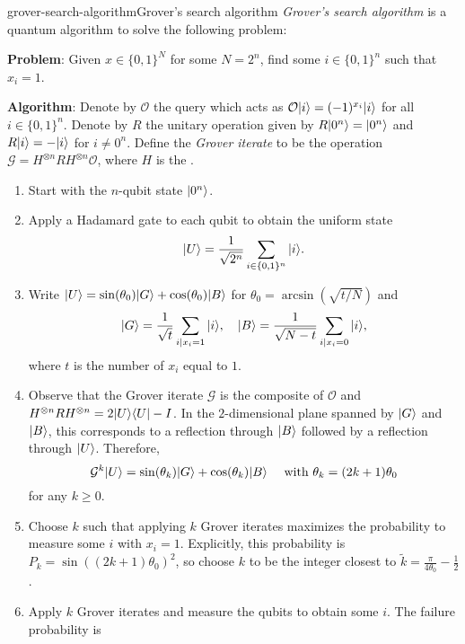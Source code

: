 \begin{topic}{grover-search-algorithm}{Grover's search algorithm}
    \emph{Grover's search algorithm} is a quantum algorithm to solve the following problem:

    \textbf{Problem}: Given $x \in \{ 0, 1 \}^N$ for some $N = 2^n$, find some $i \in \{ 0, 1 \}^n$ such that $x_i = 1$.

    \textbf{Algorithm}: Denote by $\mathcal{O}$ the query which acts as $\mathcal{O} |i\rangle = (-1)^{x_i} |i\rangle$ for all $i \in \{ 0, 1 \}^n$. Denote by $R$ the unitary operation given by $R |0^n\rangle = |0^n\rangle$ and $R |i\rangle = - |i\rangle$ for $i \ne 0^n$. Define the \textit{Grover iterate} to be the operation $\mathcal{G} = H^{\otimes n} R H^{\otimes n} \mathcal{O}$, where $H$ is the .
    \begin{enumerate}[label=(\arabic*)]
        \item Start with the $n$-qubit state $|0^n\rangle$.
        \item Apply a Hadamard gate to each qubit to obtain the uniform state
        \[ |U\rangle = \frac{1}{\sqrt{2^n}} \sum_{i \in \{ 0, 1 \}^n } |i\rangle . \]
        \item Write $|U\rangle = \sin(\theta_0) |G\rangle + \cos(\theta_0) |B\rangle$ for $\theta_0 = \arcsin(\sqrt{t / N})$ and
        \[ |G\rangle = \frac{1}{\sqrt{t}} \sum_{i \mid x_i = 1} |i\rangle, \quad |B\rangle = \frac{1}{\sqrt{N - t}} \sum_{i \mid x_i = 0} |i\rangle , \]
        where $t$ is the number of $x_i$ equal to $1$.
        \item Observe that the Grover iterate $\mathcal{G}$ is the composite of $\mathcal{O}$ and $H^{\otimes n} R H^{\otimes n} = 2 |U\rangle \langle U| - I$. In the $2$-dimensional plane spanned by $|G\rangle$ and $|B\rangle$, this corresponds to a reflection through $|B\rangle$ followed by a reflection through $|U\rangle$. Therefore,
        \[ \mathcal{G}^k |U\rangle = \sin(\theta_k) |G\rangle + \cos(\theta_k) |B\rangle \quad \textup{ with } \theta_k = (2k + 1) \theta_0 \]
        for any $k \ge 0$.
        \item Choose $k$ such that applying $k$ Grover iterates maximizes the probability to measure some $i$ with $x_i = 1$. Explicitly, this probability is $P_k = \sin((2k + 1) \theta_0)^2$, so choose $k$ to be the integer closest to $\tilde{k} = \tfrac{\pi}{4 \theta_0} - \tfrac{1}{2}$.
        \item Apply $k$ Grover iterates and measure the qubits to obtain some $i$. The failure probability is
        \[ \begin{aligned}

\end{aligned}\]
\end{enumerate}
\end{topic}
